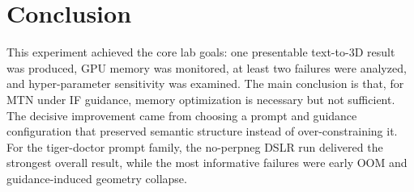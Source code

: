 \documentclass[sigconf,nonacm]{acmart}
\begin{document}
\section{Conclusion}
This experiment achieved the core lab goals: one presentable text-to-3D result was produced, GPU memory was monitored, at least two failures were analyzed, and hyper-parameter sensitivity was examined. The main conclusion is that, for MTN under IF guidance, memory optimization is necessary but not sufficient. The decisive improvement came from choosing a prompt and guidance configuration that preserved semantic structure instead of over-constraining it. For the tiger-doctor prompt family, the no-perpneg DSLR run delivered the strongest overall result, while the most informative failures were early OOM and guidance-induced geometry collapse.



\end{document}
